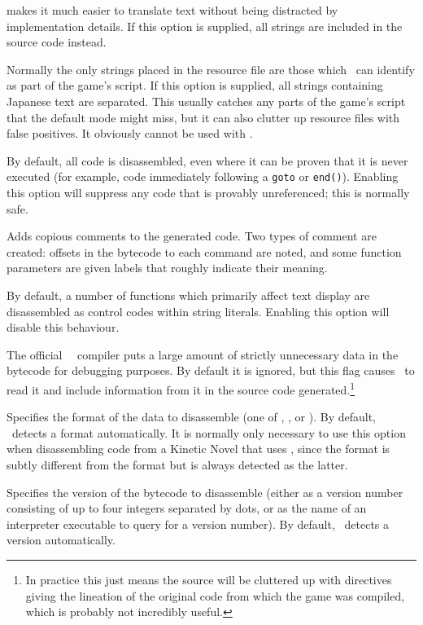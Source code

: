 \begin{nicelist}
\begin{extraopts}
      makes it much easier to translate text without being distracted by
      implementation details.  If this option is supplied, all strings are
      included in the source code instead.
    \item[\clboth{S}{separate-all}]
      Normally the only strings placed in the resource file are those which
      \archiver\ can identify as part of the game's script.  If this option is
      supplied, all strings containing Japanese text are separated.  This
      usually catches any parts of the game's script that the default mode might
      miss, but it can also clutter up resource files with false positives.  It
      obviously cannot be used with .
    \item[\clboth{u}{unreferenced}]
      By default, all code is disassembled, even where it can be proven that it
      is never executed (for example, code immediately following a
      \lstinline|goto| or \lstinline|end()|).  Enabling this option will
      suppress any code that is provably unreferenced; this is normally safe.
    \item[\clboth{n}{annotate}]
      Adds copious comments to the generated code.  Two types of comment are
      created: offsets in the bytecode to each command are noted, and some
      function parameters are given labels that roughly indicate their meaning.
    \item[\clboth{r}{no-codes}]
      By default, a number of functions which primarily affect text display are
      disassembled as control codes within string literals.  Enabling this
      option will disable this behaviour.
    \item[\clboth{g}{debug-info}]
      The official \vas\ \reallive\ compiler puts a large amount of strictly
      unnecessary data in the bytecode for debugging purposes.  By default it is
      ignored, but this flag causes \archiver\ to read it and include information
      from it in the source code generated.\footnote{In practice this just means
      the source will be cluttered up with  directives giving
      the lineation of the original code from which the game was compiled,
      which is probably not incredibly useful.}
    \item[\clbarg{t}{target}{TARGET}]
      Specifies the format of the data to disassemble (one of ,
      , or ).  By default, \disassembler\ detects a format
      automatically.  It is normally only necessary to use this option when
      disassembling code from a Kinetic Novel that uses ,
      since the  format is subtly different from the 
      format but is always detected as the latter.
    \item[\clbarg{f}{target-version}{VER}]
      Specifies the version of the bytecode to disassemble (either as a version
      number consisting of up to four integers separated by dots, or as the name
      of an interpreter executable to query for a version number).  By default,
      \disassembler\ detects a version automatically.
    \end{extraopts}
  \end{nicelist}

